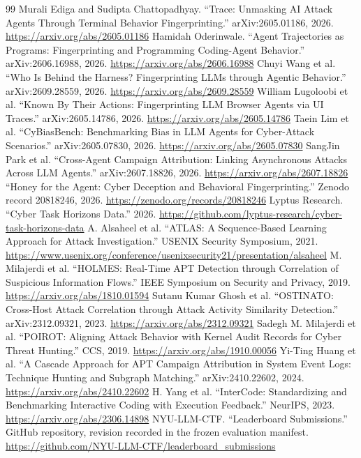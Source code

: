 \documentclass[10pt]{article}
\begin{document}
\begin{thebibliography}{99}
 Murali Ediga and Sudipta Chattopadhyay. ``Trace: Unmasking AI Attack Agents Through Terminal Behavior Fingerprinting.'' arXiv:2605.01186, 2026. \url{https://arxiv.org/abs/2605.01186}
 Hamidah Oderinwale. ``Agent Trajectories as Programs: Fingerprinting and Programming Coding-Agent Behavior.'' arXiv:2606.16988, 2026. \url{https://arxiv.org/abs/2606.16988}
 Chuyi Wang et al. ``Who Is Behind the Harness? Fingerprinting LLMs through Agentic Behavior.'' arXiv:2609.28559, 2026. \url{https://arxiv.org/abs/2609.28559}
 William Lugoloobi et al. ``Known By Their Actions: Fingerprinting LLM Browser Agents via UI Traces.'' arXiv:2605.14786, 2026. \url{https://arxiv.org/abs/2605.14786}
 Taein Lim et al. ``CyBiasBench: Benchmarking Bias in LLM Agents for Cyber-Attack Scenarios.'' arXiv:2605.07830, 2026. \url{https://arxiv.org/abs/2605.07830}
 SangJin Park et al. ``Cross-Agent Campaign Attribution: Linking Asynchronous Attacks Across LLM Agents.'' arXiv:2607.18826, 2026. \url{https://arxiv.org/abs/2607.18826}
 ``Honey for the Agent: Cyber Deception and Behavioral Fingerprinting.'' Zenodo record 20818246, 2026. \url{https://zenodo.org/records/20818246}
 Lyptus Research. ``Cyber Task Horizons Data.'' 2026. \url{https://github.com/lyptus-research/cyber-task-horizons-data}
 A. Alsaheel et al. ``ATLAS: A Sequence-Based Learning Approach for Attack Investigation.'' USENIX Security Symposium, 2021. \url{https://www.usenix.org/conference/usenixsecurity21/presentation/alsaheel}
 M. Milajerdi et al. ``HOLMES: Real-Time APT Detection through Correlation of Suspicious Information Flows.'' IEEE Symposium on Security and Privacy, 2019. \url{https://arxiv.org/abs/1810.01594}
 Sutanu Kumar Ghosh et al. ``OSTINATO: Cross-Host Attack Correlation through Attack Activity Similarity Detection.'' arXiv:2312.09321, 2023. \url{https://arxiv.org/abs/2312.09321}
 Sadegh M. Milajerdi et al. ``POIROT: Aligning Attack Behavior with Kernel Audit Records for Cyber Threat Hunting.'' CCS, 2019. \url{https://arxiv.org/abs/1910.00056}
 Yi-Ting Huang et al. ``A Cascade Approach for APT Campaign Attribution in System Event Logs: Technique Hunting and Subgraph Matching.'' arXiv:2410.22602, 2024. \url{https://arxiv.org/abs/2410.22602}
 H. Yang et al. ``InterCode: Standardizing and Benchmarking Interactive Coding with Execution Feedback.'' NeurIPS, 2023. \url{https://arxiv.org/abs/2306.14898}
 NYU-LLM-CTF. ``Leaderboard Submissions.'' GitHub repository, revision recorded in the frozen evaluation manifest. \url{https://github.com/NYU-LLM-CTF/leaderboard_submissions}
\end{thebibliography}
\end{document}
